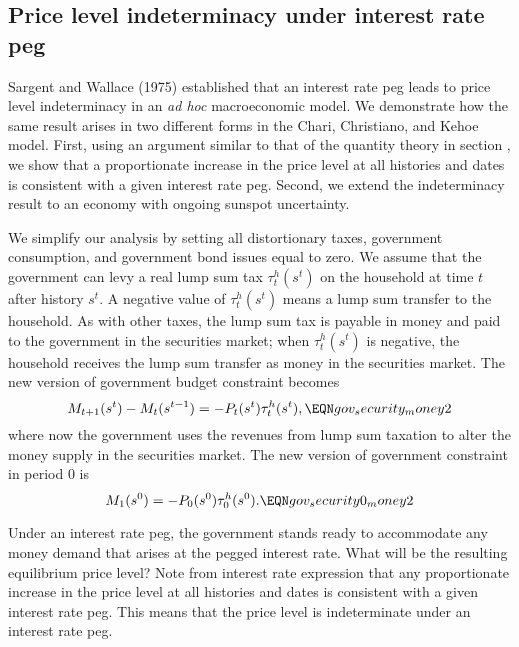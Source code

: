 \subsection{Price level indeterminacy under interest rate peg}\label{sec:SW_interestpeg}%
 Sargent and Wallace (1975) established
that an interest rate peg  leads to price level indeterminacy in an {\it ad hoc\/} macroeconomic model.
We demonstrate how the same result arises in two different forms in the
Chari, Christiano, and Kehoe model. First, using  an argument similar to that of the
quantity theory in section , we show that a proportionate
increase in the price level at all histories and dates is consistent with a
given interest rate peg.
Second, we extend the indeterminacy result to an economy
with ongoing sunspot uncertainty.

We simplify our analysis  by setting all distortionary taxes,
government consumption, and government bond issues equal to zero.  We
 assume that the government can levy a real lump sum tax $\tau^h_t(s^t)$
on the household at time $t$ after history $s^t$.  %
A negative value of $\tau^h_t(s^t)$ means a lump sum
transfer to the household. As with other taxes, the lump sum tax is
payable in money and paid to the government in the securities market;
when $\tau^h_t(s^t)$ is negative, the household receives the lump sum
transfer as money in the securities market. The new version of government
budget constraint  becomes
$$
M_{t+1}(s^t) - M_t(s^{t-1}) = - P_t(s^t) \tau^h_t(s^t),
                                               \EQN gov_security_money2
$$
where now the government uses the revenues from lump sum taxation to
alter the money supply in the securities market. The new version of
government constraint  in period $0$ is
$$
M_{1}(s^0)  = - P_0(s^0) \tau^h_0(s^0). \EQN gov_security0_money2
$$

Under an interest rate peg, the government stands
ready to accommodate any money demand that arises at the pegged
interest rate.
What will be the resulting equilibrium price level? Note
from interest rate expression  that any
proportionate increase in the price level at all histories and dates
is consistent with a given interest rate peg. This means that the price level
is indeterminate under an interest rate peg.

